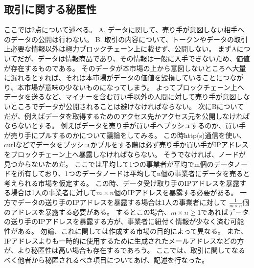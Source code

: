 \subsection{取引に関する秘匿性}
ここでは2点について述べる。
A. データに関して、売り手が意図しない相手へのデータの公開は行わない。
B. 取引の内容について、トークンやデータの取引上必要な情報以外は極力ブロックチェーン上に載せず、公開しない。
まずAについてだが、データは情報商品であり、その情報は一般に入手できないため、価値が存在するものである。
そのデータが本市場の上から意図しないところへ大量に漏れるとすれば、それは本市場がデータの価値を毀損していることにつながり、本市場が意味の少ないものになってしまう。
よってブロックチェーン上へデータを送るなど、マイナーを含む買い手以外の人間に対して売り手が意図しないところでデータが公開されることは避けなければならない。
次にBについてだが、例えばデータを取得するためのアクセス先かアクセス元を公開しなければならないとする。
例えばデータを売り手が買い手へプッシュするのか、買い手が売り手にプルするのかについて議論をしてみる。
この時http(s)通信を使い、 curlなどでデータをプッシュかプルをする際は必ず売り手か買い手がIPアドレスをブロックチェーン上へ暴露しなければならない。
そうでなければ、ノードが見つからないためだ。
ここでは平均して1つの事業者が平均でm個のデータノードを所有しており、1つのデータノードは平均してn個の事業者にデータを売ると考えられる市場を仮定する。
この時、データ受け取り手のIPアドレスを暴露する場合は1人の事業者に対して\(m \times n \)個のIPアドレスを暴露する必要がある。
一方でデータの送り手のIPアドレスを暴露する場合は1人の事業者に対して \(\frac{1}{ m \times n }\)個のアドレスを暴露する必要がある。
するとこの場合、\(m \times n \ge 1\)であればデータの送り手のIPアドレスを暴露する方が、事業者に紐付く情報が少なく済む可能性がある。
勿論、これに関しては作成する市場の目的によって異なる。
また、IPアドレスよりも一時的に使用するために生成されたメールアドレスなどの方が、より秘匿性は高い場合も存在するであろう。
ここでは、取引に関してなるべく他者から秘匿されるべき項目についてあげ、記述を行なった。

